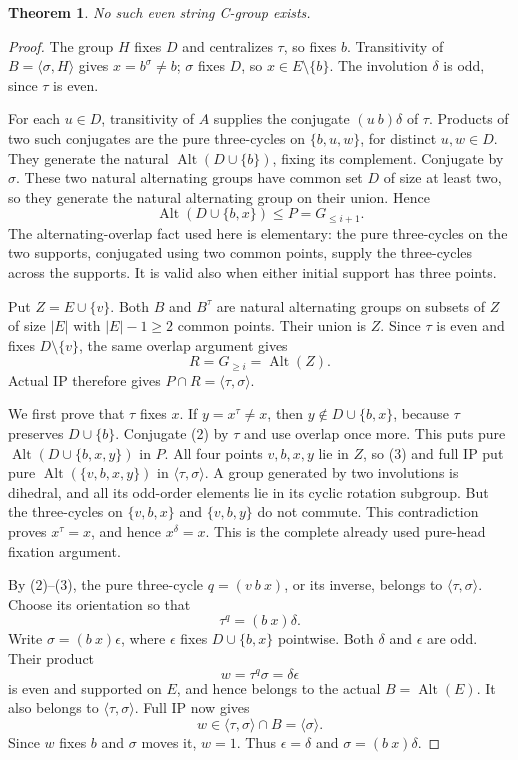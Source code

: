 \documentclass[11pt,a4paper]{article}
\newtheorem{theorem}{Theorem}
\newcommand{\gen}[1]{\langle#1\rangle}
\newcommand{\Alt}{\operatorname{Alt}}
\begin{document}
\begin{theorem}
No such even string C-group exists.
\end{theorem}
\begin{proof}
The group $H$ fixes $D$ and centralizes $\tau$, so fixes $b$.
Transitivity of $B=\gen{\sigma,H}$ gives $x=b^\sigma\ne b$;
$\sigma$ fixes $D$, so $x\in E\setminus\{b\}$.
The involution $\delta$ is odd, since $\tau$ is even.

For each $u\in D$, transitivity of $A$ supplies the conjugate
$(u\ b)\delta$ of $\tau$. Products of two such conjugates are the
pure three-cycles on $\{b,u,w\}$, for distinct $u,w\in D$.
They generate the natural $\Alt(D\cup\{b\})$, fixing its complement.
Conjugate by $\sigma$. These two natural alternating groups have
common set $D$ of size at least two, so they generate the natural
alternating group on their union. Hence
\[
 \Alt(D\cup\{b,x\})\le P=G_{\le i+1}.                    \tag{2}
\]
The alternating-overlap fact used here is elementary: the pure
three-cycles on the two supports, conjugated using two common
points, supply the three-cycles across the supports. It is valid
also when either initial support has three points.

Put $Z=E\cup\{v\}$. Both $B$ and $B^\tau$ are natural alternating
groups on subsets of $Z$ of size $|E|$ with $|E|-1\ge2$ common
points. Their union is $Z$. Since $\tau$ is even and fixes
$D\setminus\{v\}$, the same overlap argument gives
\[
                       R=G_{\ge i}=\Alt(Z).             \tag{3}
\]
Actual IP therefore gives $P\cap R=\gen{\tau,\sigma}$.

We first prove that $\tau$ fixes $x$. If $y=x^\tau\ne x$,
then $y\notin D\cup\{b,x\}$, because $\tau$ preserves
$D\cup\{b\}$. Conjugate (2) by $\tau$ and use overlap once
more. This puts pure $\Alt(D\cup\{b,x,y\})$ in $P$.
All four points $v,b,x,y$ lie in $Z$, so (3) and full IP put
pure $\Alt(\{v,b,x,y\})$ in $\gen{\tau,\sigma}$.
A group generated by two involutions is dihedral, and all its
odd-order elements lie in its cyclic rotation subgroup. But the
three-cycles on $\{v,b,x\}$ and $\{v,b,y\}$ do not commute.
This contradiction proves $x^\tau=x$, and hence $x^\delta=x$.
This is the complete already used pure-head fixation argument.

By (2)--(3), the pure three-cycle $q=(v\ b\ x)$, or its inverse,
belongs to $\gen{\tau,\sigma}$. Choose its orientation so that
\[
                          \tau^q=(b\ x)\delta.
\]
Write $\sigma=(b\ x)\epsilon$, where $\epsilon$ fixes
$D\cup\{b,x\}$ pointwise. Both $\delta$ and $\epsilon$ are odd.
Their product
\[
 w=\tau^q\sigma=\delta\epsilon
\]
is even and supported on $E$, and hence belongs to the actual
$B=\Alt(E)$. It also belongs to $\gen{\tau,\sigma}$.
Full IP now gives
\[
          w\in\gen{\tau,\sigma}\cap B=\gen{\sigma}.
\]
Since $w$ fixes $b$ and $\sigma$ moves it, $w=1$.
Thus $\epsilon=\delta$ and $\sigma=(b\ x)\delta$.


\end{proof}
\end{document}

